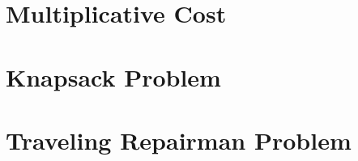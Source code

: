 \documentclass[11pt, oneside]{article}   	%
\begin{document}
\section{Multiplicative Cost}

\section{Knapsack Problem}

\section{Traveling Repairman Problem}
\end{document}
